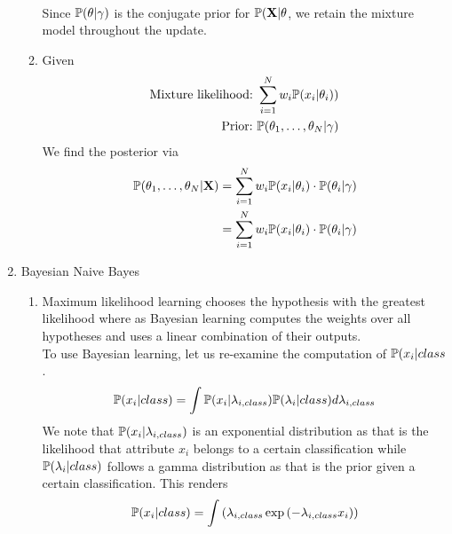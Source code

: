 \documentclass{article}
\begin{document}
\begin{enumerate}
\begin{enumerate}
\begin{align*}
              \end{align*}
              Since \(\mathbb{P}(\theta|\gamma)\) is the conjugate prior for 
              \(\mathbb{P}(\mathbf{X}|\theta\), we retain the mixture model 
              throughout the update.
            \item %
              Given
              \begin{align*}
                \textnormal{Mixture likelihood:\ } \sum_{i=1}^N w_i\mathbb{P}(x_i | \theta_i)) \\
                \textnormal{Prior:\ } \mathbb{P}(\theta_1,\hdots,\theta_N|\gamma)
              \end{align*}
              We find the posterior via
              \begin{align*}
                \mathbb{P}(\theta_1,\hdots,\theta_N|\mathbf{X})
                &=  \sum_{i=1}^N w_i\mathbb{P}(x_i | \theta_i)\cdot\mathbb{P}(\theta_i|\gamma) \\
                &=  \sum_{i=1}^N w_i\mathbb{P}(x_i | \theta_i)\cdot\mathbb{P}(\theta_i|\gamma)
              \end{align*}   
        \end{enumerate}
    \item Bayesian Naive Bayes %
        \begin{enumerate}
            \item %
                Maximum likelihood learning chooses the hypothesis with the
                greatest likelihood where as Bayesian learning computes
                the weights over all hypotheses and uses a linear
                combination of their outputs. \\
                To use Bayesian learning, let us re-examine the computation
                of \(\mathbb{P}(x_i|class\).
                \begin{equation*}
                  \mathbb{P}(x_i|class)
                  =  \int \mathbb{P}(x_i|\lambda_{i,class})\mathbb{P}(\lambda_i|class) d\lambda_{i,class}
                \end{equation*}
                We note that \(\mathbb{P}(x_i|\lambda_{i,class})\) is an exponential distribution as
                that is the likelihood that attribute \(x_i\) belongs to a certain classification
                while \(\mathbb{P}(\lambda_i|class)\) follows a gamma distribution as that is the prior
                given a certain classification. This renders
                \begin{equation*}
                  \pr(x_i|class)
                  =  \int \left(\lambda_{i,class}\exp\left(-\lambda_{i,class}x_i\right)\right)

\end{equation*}
\end{enumerate}
\end{enumerate}
\end{document}
